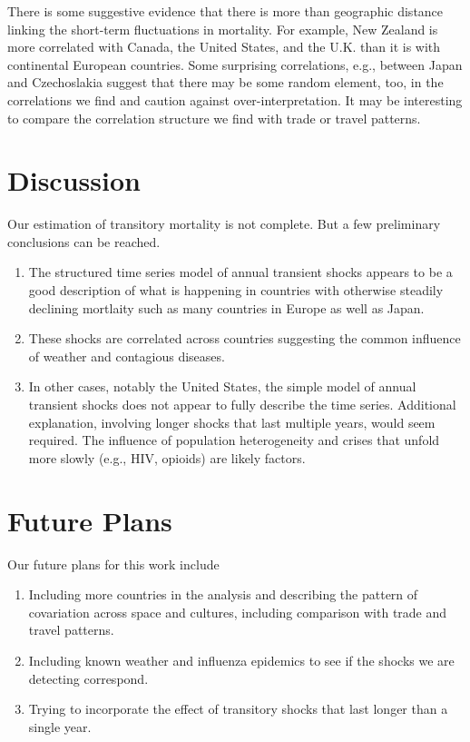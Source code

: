 \documentclass[12pt]{article}
\begin{document}
There is some suggestive evidence that there is more than geographic
distance linking the short-term fluctuations in mortality. For
example, New Zealand is  more correlated with Canada, the United
States, and the U.K. than it is with continental European countries.
Some surprising correlations, e.g., between Japan and Czechoslakia
suggest that there may be some random element, too, in the
correlations we find and caution against over-interpretation. It may
be interesting to compare the correlation structure we find with trade
or travel patterns. 


\section{Discussion}

Our estimation of transitory mortality is not complete. But a few
preliminary conclusions can be reached.

\begin{enumerate}

\item The structured time series model of annual transient shocks
  appears to be a good description of what is happening in countries
  with otherwise steadily declining mortlaity such as many countries
  in Europe as well as Japan.

  \item These shocks are correlated across countries suggesting the
    common influence of weather and contagious diseases.

  \item In other cases, notably the United States, the simple model of
    annual transient shocks does not appear to fully describe the time
    series. Additional explanation, involving longer shocks that last
    multiple years, would seem required. The influence of population
    heterogeneity and crises that unfold more slowly (e.g., HIV,
    opioids) are likely factors.

  \end{enumerate}


  \section{Future Plans}

  Our future plans for this work include

  \begin{enumerate}

  \item Including more countries in the analysis and describing the
    pattern of covariation across space and cultures, including
    comparison with trade and travel patterns.


  \item Including known weather and influenza epidemics
    to see if the shocks we are detecting correspond.

  \item Trying to incorporate the effect of transitory shocks that
    last longer than a single year.

  \end{enumerate}
  
\end{document}
